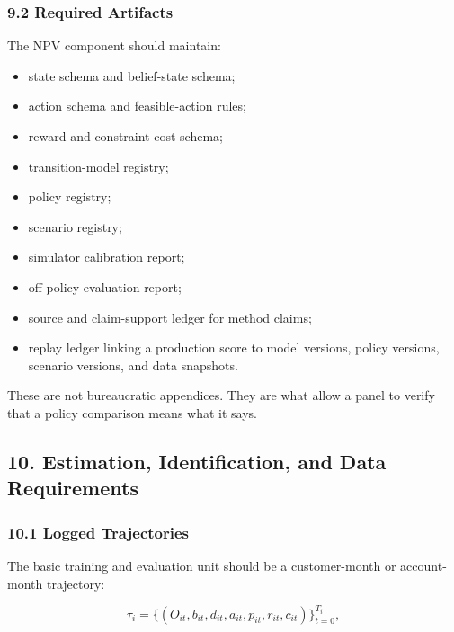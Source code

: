 \documentclass[
]{article}
\providecommand{\tightlist}{%
  \setlength{\itemsep}{0pt}\setlength{\parskip}{0pt}}
\begin{document}
\hypertarget{required-artifacts}{%
\subsubsection{9.2 Required Artifacts}\label{required-artifacts}}

The NPV component should maintain:

\begin{itemize}
\tightlist
\item
  state schema and belief-state schema;
\item
  action schema and feasible-action rules;
\item
  reward and constraint-cost schema;
\item
  transition-model registry;
\item
  policy registry;
\item
  scenario registry;
\item
  simulator calibration report;
\item
  off-policy evaluation report;
\item
  source and claim-support ledger for method claims;
\item
  replay ledger linking a production score to model versions, policy
  versions, scenario versions, and data snapshots.
\end{itemize}

These are not bureaucratic appendices. They are what allow a panel to
verify that a policy comparison means what it says.

\hypertarget{estimation-identification-and-data-requirements}{%
\subsection{10. Estimation, Identification, and Data
Requirements}\label{estimation-identification-and-data-requirements}}

\hypertarget{logged-trajectories}{%
\subsubsection{10.1 Logged Trajectories}\label{logged-trajectories}}

The basic training and evaluation unit should be a customer-month or
account-month trajectory:

\begin{equation}
  \tau_i
  =
  \bigl\{
    (O_{it},b_{it},d_{it},a_{it},p_{it},r_{it},c_{it})
  \bigr\}_{t=0}^{T_i},
  \label{eq:logged-trajectory}
\end{equation}
\end{document}
